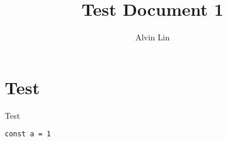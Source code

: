 \documentclass[letterpaper, 12pt]{article}
\title{Test Document 1}
\author{Alvin Lin}
\begin{document}
\maketitle

\section*{Test}
Test

\begin{verbatim}
const a = 1
\end{verbatim}
\end{document}
